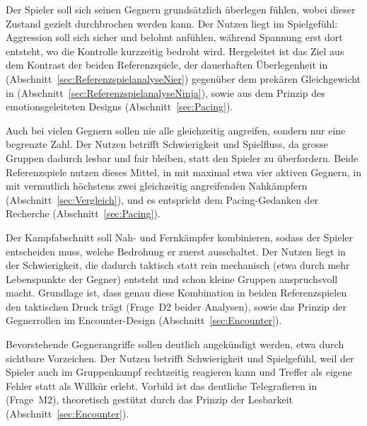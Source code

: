 \documentclass[../Main.tex]{subfiles}
\begin{document}
\begin{description}[style=nextline, leftmargin=0pt, itemsep=0.8em]
    \item[\textbf{Designziel 1: Überlegenheit als Grundzustand}]
        Der Spieler soll sich seinen Gegnern grundsätzlich überlegen fühlen, wobei dieser Zustand gezielt durchbrochen werden kann. Der Nutzen liegt im Spielgefühl: Aggression soll sich sicher und belohnt anfühlen, während Spannung erst dort entsteht, wo die Kontrolle kurzzeitig bedroht wird. Hergeleitet ist das Ziel aus dem Kontrast der beiden Referenzspiele, der dauerhaften Überlegenheit in  (Abschnitt~\ref{sec:ReferenzspielanalyseNier}) gegenüber dem prekären Gleichgewicht in  (Abschnitt~\ref{sec:ReferenzspielanalyseNinja}), sowie aus dem Prinzip des emotionsgeleiteten Designs (Abschnitt~\ref{sec:Pacing}).

    \item[\textbf{Designziel 2: Begrenzung gleichzeitiger Angreifer}]
        Auch bei vielen Gegnern sollen nie alle gleichzeitig angreifen, sondern nur eine begrenzte Zahl. Der Nutzen betrifft Schwierigkeit und Spielfluss, da grosse Gruppen dadurch lesbar und fair bleiben, statt den Spieler zu überfordern. Beide Referenzspiele nutzen dieses Mittel, in  mit maximal etwa vier aktiven Gegnern, in  mit vermutlich höchstens zwei gleichzeitig angreifenden Nahkämpfern (Abschnitt~\ref{sec:Vergleich}), und es entspricht dem Pacing-Gedanken der Recherche (Abschnitt~\ref{sec:Pacing}).

    \item[\textbf{Designziel 3: Ein taktisches Dilemma durch zwei Gegnerrollen}]
        Der Kampfabschnitt soll Nah- und Fernkämpfer kombinieren, sodass der Spieler entscheiden muss, welche Bedrohung er zuerst ausschaltet. Der Nutzen liegt in der Schwierigkeit, die dadurch taktisch statt rein mechanisch (etwa durch mehr Lebenspunkte der Gegner) entsteht und schon kleine Gruppen anspruchsvoll macht. Grundlage ist, dass genau diese Kombination in beiden Referenzspielen den taktischen Druck trägt (Frage~D2 beider Analysen), sowie das Prinzip der Gegnerrollen im Encounter-Design (Abschnitt~\ref{sec:Encounter}).

    \item[\textbf{Designziel 4: Klar telegrafierte Angriffe}]
        Bevorstehende Gegnerangriffe sollen deutlich angekündigt werden, etwa durch sichtbare Vorzeichen. Der Nutzen betrifft Schwierigkeit und Spielgefühl, weil der Spieler auch im Gruppenkampf rechtzeitig reagieren kann und Treffer als eigene Fehler statt als Willkür erlebt. Vorbild ist das deutliche Telegrafieren in  (Frage~M2), theoretisch gestützt durch das Prinzip der Lesbarkeit (Abschnitt~\ref{sec:Encounter}).
\end{description}
\end{document}
